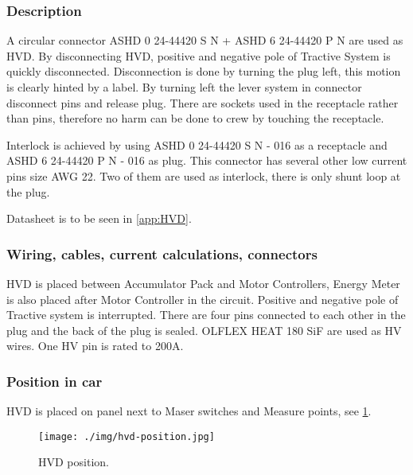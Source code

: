 \subsubsection{Description}

A circular connector ASHD 0 24-44420 S N + ASHD 6 24-44420 P N are used as HVD. By disconnecting HVD, positive and negative pole of Tractive System is quickly disconnected. Disconnection is done by turning the plug left, this motion is clearly hinted by a label. By turning left the lever system in connector disconnect pins and release plug. There are sockets used in the receptacle rather than pins, therefore no harm can be done to crew by touching the receptacle. 

Interlock is achieved by using ASHD 0 24-44420 S N - 016 as a receptacle and ASHD 6 24-44420 P N - 016 as plug. This connector has several other low current pins size AWG 22. Two of them are used as interlock, there is only shunt loop at the plug.

Datasheet is to be seen in \ref{app:HVD}.

\subsubsection{Wiring, cables, current calculations, connectors}

HVD is placed between Accumulator Pack and Motor Controllers, Energy Meter is also placed after Motor Controller in the circuit. Positive and negative pole of Tractive system is interrupted. There are four pins connected to each other in the plug and the back of the plug is sealed. OLFLEX HEAT 180 SiF are used as HV wires. One HV pin is rated to 200A.

\subsubsection{Position in car}

HVD is placed on panel next to Maser switches and Measure points, see \ref{fig:hvd-position}.

\begin{figure}[H]
	\centering
	\texttt{[image: ./img/hvd-position.jpg]}
	\caption{HVD position.}
	\label{fig:hvd-position}
\end{figure}